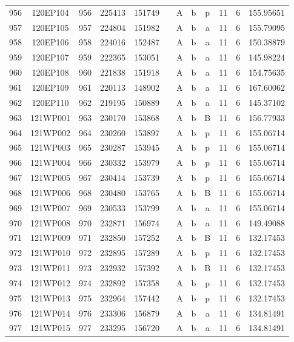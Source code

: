 \begin{tabular}{|*{12}{c|}}
956 & 120EP104 & 956 & 225413 & 151749 &  & A & b & p & 11 & 6 & 155.95651 \\ 
957 & 120EP105 & 957 & 224804 & 151982 &  & A & b & a & 11 & 6 & 155.79095 \\ 
958 & 120EP106 & 958 & 224016 & 152487 &  & A & b & a & 11 & 6 & 150.38879 \\ 
959 & 120EP107 & 959 & 222365 & 153051 &  & A & b & a & 11 & 6 & 145.98224 \\ 
960 & 120EP108 & 960 & 221838 & 151918 &  & A & b & a & 11 & 6 & 154.75635 \\ 
961 & 120EP109 & 961 & 220113 & 148902 &  & A & b & a & 11 & 6 & 167.60062 \\ 
962 & 120EP110 & 962 & 219195 & 150889 &  & A & b & a & 11 & 6 & 145.37102 \\ 
963 & 121WP001 & 963 & 230170 & 153868 &  & A & b & B & 11 & 6 & 156.77933 \\ 
964 & 121WP002 & 964 & 230260 & 153897 &  & A & b & p & 11 & 6 & 155.06714 \\ 
965 & 121WP003 & 965 & 230287 & 153945 &  & A & b & p & 11 & 6 & 155.06714 \\ 
966 & 121WP004 & 966 & 230332 & 153979 &  & A & b & p & 11 & 6 & 155.06714 \\ 
967 & 121WP005 & 967 & 230414 & 153739 &  & A & b & p & 11 & 6 & 155.06714 \\ 
968 & 121WP006 & 968 & 230480 & 153765 &  & A & b & B & 11 & 6 & 155.06714 \\ 
969 & 121WP007 & 969 & 230533 & 153799 &  & A & b & a & 11 & 6 & 155.06714 \\ 
970 & 121WP008 & 970 & 232871 & 156974 &  & A & b & a & 11 & 6 & 149.49088 \\ 
971 & 121WP009 & 971 & 232850 & 157252 &  & A & b & B & 11 & 6 & 132.17453 \\ 
972 & 121WP010 & 972 & 232895 & 157289 &  & A & b & p & 11 & 6 & 132.17453 \\ 
973 & 121WP011 & 973 & 232932 & 157392 &  & A & b & B & 11 & 6 & 132.17453 \\ 
974 & 121WP012 & 974 & 232892 & 157358 &  & A & b & p & 11 & 6 & 132.17453 \\ 
975 & 121WP013 & 975 & 232964 & 157442 &  & A & b & p & 11 & 6 & 132.17453 \\ 
976 & 121WP014 & 976 & 233306 & 156879 &  & A & b & a & 11 & 6 & 134.81491 \\ 
977 & 121WP015 & 977 & 233295 & 156720 &  & A & b & a & 11 & 6 & 134.81491 \\ 

\end{tabular}
